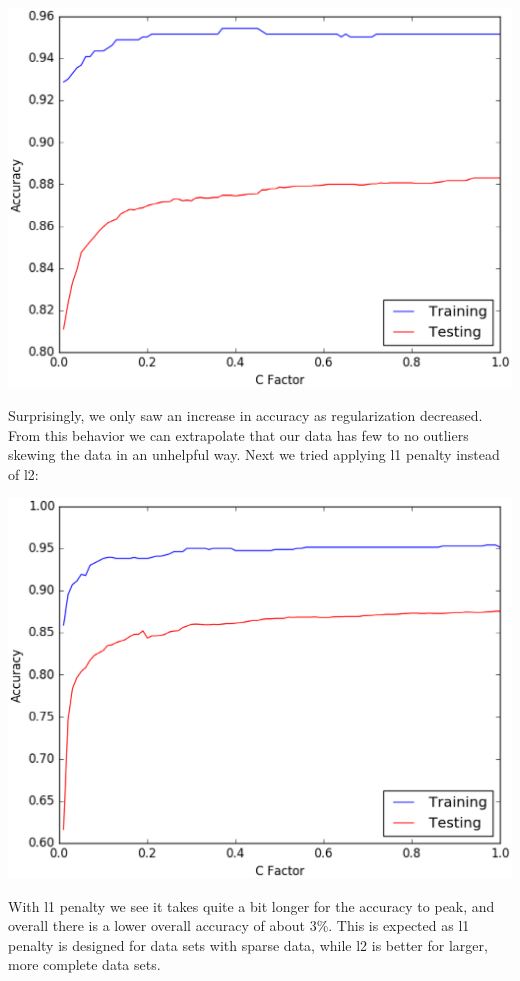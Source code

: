 \documentclass[10pt,letterpaper,onecolumn,draftclsnofoot]{IEEEtran}
\begin{document}
	 \includegraphics[scale=.75]{l2penalty}
	 
	 
	 Surprisingly, we only saw an increase in accuracy as regularization decreased. From
	 this behavior we can extrapolate that our data has few to no outliers skewing the
	 data in an unhelpful way. Next we tried applying l1 penalty instead of l2:
	 
	 
	 \includegraphics[scale=.75]{l1penalty}
	 
	 
	 With l1 penalty we see it takes quite a bit longer for the accuracy to peak, and 
	 overall there is a lower overall accuracy of about 3\%. This is expected as l1 
	 penalty is designed for data sets with sparse data, while l2 is better for larger,
	 more complete data sets.
	 
\end{document}
